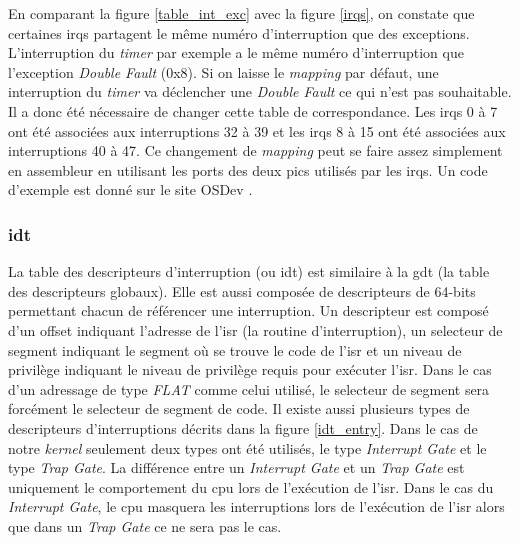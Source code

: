 En comparant la figure \ref{table_int_exc} avec la figure \ref{irqs}, on constate
que certaines \acrshort{irq}s partagent le même numéro d'interruption que des
exceptions. L'interruption du \textit{timer} par exemple a le même numéro d'interruption
que l'exception \textit{Double Fault} (0x8). Si on laisse le \textit{mapping} par
défaut, une interruption du \textit{timer} va déclencher une \textit{Double Fault}
ce qui n'est pas souhaitable. Il a donc été nécessaire de changer cette table
de correspondance. Les \acrshort{irq}s 0 à 7 ont été associées aux interruptions
32 à 39 et les \acrshort{irq}s 8 à 15 ont été associées aux interruptions 40 à 47.
Ce changement de \textit{mapping} peut se faire assez simplement en assembleur en
utilisant les ports des deux \acrshort{pic}s utilisés par les \acrshort{irq}s.
Un code d'exemple est donné sur le site OSDev \cite{ref22}.


\subsubsection{\acrshort{idt}}
La table des descripteurs d'interruption (ou \acrshort{idt}) est similaire à la
\acrshort{gdt} (la table des descripteurs globaux). Elle est aussi composée de
descripteurs de 64-bits permettant chacun de référencer une interruption. Un
descripteur est composé d'un offset indiquant l'adresse de l'\acrshort{isr} (la
routine d'interruption), un selecteur de segment indiquant le segment où se trouve
le code de l'\acrshort{isr} et un niveau de privilège indiquant le niveau de privilège
requis pour exécuter l'\acrshort{isr}. Dans le cas d'un adressage de type \textit{FLAT}
comme celui utilisé, le selecteur de segment sera forcément le selecteur de segment
de code. Il existe aussi plusieurs types de descripteurs d'interruptions \cite{ref66}
décrits dans la figure \ref{idt_entry}. Dans le cas de notre \textit{kernel} seulement
deux types ont été utilisés, le type \textit{Interrupt Gate} et le type \textit{Trap Gate}.
La différence entre un \textit{Interrupt Gate} et un \textit{Trap Gate} est uniquement
le comportement du \acrshort{cpu} lors de l'exécution de l'\acrshort{isr}\cite{ref42}.
Dans le cas du \textit{Interrupt Gate}, le \acrshort{cpu} masquera les interruptions
lors de l'exécution de l'\acrshort{isr} alors que dans un \textit{Trap Gate} ce
ne sera pas le cas. \\

